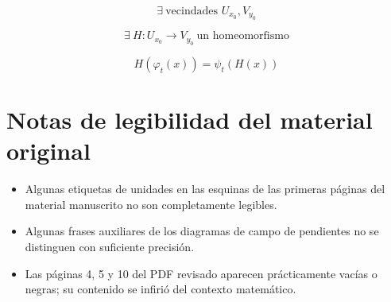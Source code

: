 \documentclass[11pt,letterpaper]{article}
\begin{document}
\[
\exists\ \text{vecindades }U_{x_0}, V_{y_0}
\]

\[
\exists\ H:U_{x_0}\to V_{y_0}\ \text{un homeomorfismo}
\]

\[
H(\varphi_t(x))=\psi_t(H(x))
\]

\section{Notas de legibilidad del material original}

\begin{itemize}
    \item Algunas etiquetas de unidades en las esquinas de las primeras páginas
          del material manuscrito no son completamente legibles.
    \item Algunas frases auxiliares de los diagramas de campo de pendientes no
          se distinguen con suficiente precisión.
    \item Las páginas 4, 5 y 10 del PDF revisado aparecen prácticamente vacías
          o negras; su contenido se infirió del contexto matemático.
\end{itemize}
\end{document}
